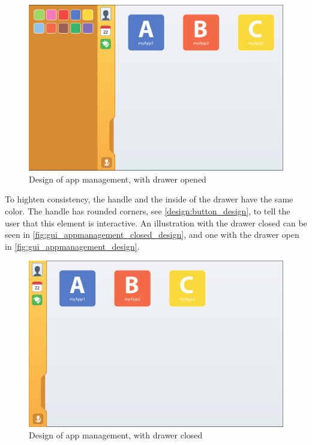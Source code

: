 \begin{figure}[!h]
	\centering
	\includegraphics[width=1\textwidth]{gfx/gui_appmanagement_open.pdf}
	\caption{Design of app management, with drawer opened}
	\label{fig:gui_appmanagement_design}
\end{figure}

To highten consistency, the handle and the inside of the drawer have the same color.
The handle has rounded corners, see \autoref{design:button_design}, to tell the user that this element is interactive.
An illustration with the drawer closed can be seen in \autoref{fig:gui_appmanagement_closed_design}, and one with the drawer open in \autoref{fig:gui_appmanagement_design}.

\begin{figure}[!h]
	\centering
	\includegraphics[width=1\textwidth]{gfx/gui_appmanagement_closed.pdf}
	\caption{Design of app management, with drawer closed}
	\label{fig:gui_appmanagement_closed_design}
\end{figure}

